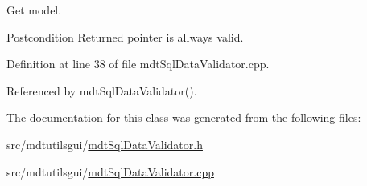 Get model. 

\begin{DoxyPostcond}{Postcondition}
Returned pointer is allways valid. 
\end{DoxyPostcond}


Definition at line 38 of file mdt\-Sql\-Data\-Validator.\-cpp.



Referenced by mdt\-Sql\-Data\-Validator().



The documentation for this class was generated from the following files\-:\begin{DoxyCompactItemize}
\item 
src/mdtutilsgui/\hyperlink{mdt_sql_data_validator_8h}{mdt\-Sql\-Data\-Validator.\-h}\item 
src/mdtutilsgui/\hyperlink{mdt_sql_data_validator_8cpp}{mdt\-Sql\-Data\-Validator.\-cpp}\end{DoxyCompactItemize}
